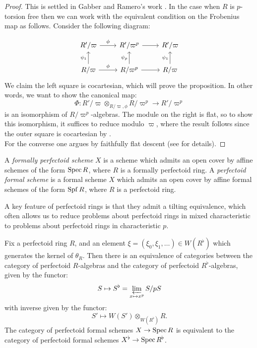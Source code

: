 \begin{proof}
This is settled in Gabber and Ramero's work \cite[16.7.21]{gabber2018almost}. 
In the case when $R$ is $p$-torsion free then we can work with the equivalent condition on the Frobenius map as follows.
Consider the following diagram:

\[\begin{tikzcd}
R'/\varpi \arrow[r, "\phi"] & R'/\varpi^p \arrow[r] & R'/\varpi \\
R/\varpi \arrow[u, "\psi_1"] \arrow[r, "\phi"] & R/\varpi^p \arrow[u, "\psi_p"] \arrow[r] & R/\varpi \arrow[u," \psi_1"]
\end{tikzcd}\]
We claim the left square is cocartesian, which will prove the proposition. In other words, we want to show the canonical map:
\[\Phi: R'/\varpi \otimes_{R/\varpi, \phi} R/\varpi^p \to R'/\varpi^p\]
is an isomorphism of $R/\varpi^p$-algebras. 
The module on the right is flat, so to show this isomorphism, it suffices to reduce modulo $\varpi$, where the result follows since the outer square is cocartesian by \cite[Theorem 3.5.13]{gabber2003almost}.\\
\indent For the converse one argues by faithfully flat descent (see \cite[16.7.21]{gabber2018almost} for details).
\end{proof}
\begin{definition} A \textit{formally perfectoid scheme} $X$ is a scheme which admits an open cover by affine schemes of the form $\operatorname{Spec}{R}$, 
where $R$ is a formally perfectoid ring. A \textit{perfectoid formal scheme} is a formal scheme $X$ which admits an open cover by affine 
formal schemes of the form $\operatorname{Spf}{R}$, where $R$ is a perfectoid ring.
\end{definition}
A key feature of perfectoid rings is that they admit a tilting equivalence, which often allows us to reduce problems about perfectoid rings in mixed 
characteristic to problems about perfectoid rings in characteristic $p$.
\begin{theorem}\label{thm:tilting}
Fix a perfectoid ring $R$, and an element $\xi = (\xi_0, \xi_1, \ldots) \in W(R^{\flat})$ which generates the kernel of $\theta_{R}$. 
Then there is an equivalence of categories between the category of perfectoid $R$-algebras and the category of perfectoid $R^{\flat}$-algebras, given by the functor:
\[S \mapsto S^{\flat} = \varprojlim_{x \mapsto x^p} S/pS\]
with inverse given by the functor:
\[S' \mapsto W(S') \otimes_{W(R^{\flat})} R.\]
The category of perfectoid formal schemes $X \rightarrow \operatorname{Spec}{R}$ is equivalent to the category of perfectoid formal schemes $X^{\flat} \rightarrow \operatorname{Spec}{R^{\flat}}$.
\end{theorem}
